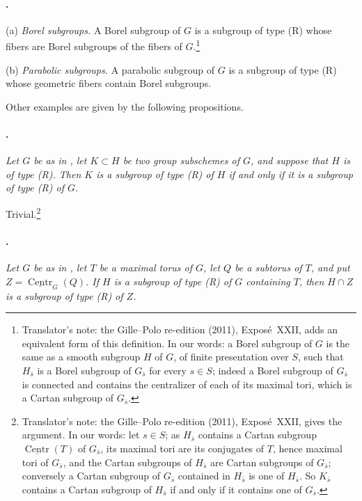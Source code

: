 \paragraph{.}
\textup{(a)} \emph{Borel subgroups.} A Borel subgroup of \(G\) is a
subgroup of type \textup{(R)} whose fibers are Borel subgroups of the
fibers of \(G\).\footnote{Translator's note: the Gille--Polo re-edition (2011), Exposé~XXII, adds an
equivalent form of this definition. In our words: a Borel subgroup of \(G\) is
the same as a smooth subgroup \(H\) of \(G\), of finite presentation over \(S\),
such that \(H_{\bar s}\) is a Borel subgroup of \(G_{\bar s}\) for every
\(s\in S\); indeed a Borel subgroup of \(G_{\bar s}\) is connected and
contains the centralizer of each of its maximal tori, which is a Cartan subgroup
of \(G_{\bar s}\).}

\textup{(b)} \emph{Parabolic subgroups.} A parabolic subgroup of
\(G\) is a subgroup of type \textup{(R)} whose geometric fibers
contain Borel subgroups.

Other examples are given by the following propositions.

\paragraph{.}
\textit{Let \(G\) be as in , let \(K\subset H\) be two group
subschemes of \(G\), and suppose that \(H\) is of type
\textup{(R)}. Then \(K\) is a subgroup of type \textup{(R)} of
\(H\) if and only if it is a subgroup of type \textup{(R)} of
\(G\).}

Trivial.\footnote{Translator's note: the Gille--Polo re-edition (2011), Exposé~XXII, gives
the argument. In our words: let \(s\in S\); as \(H_{\bar s}\) contains a Cartan
subgroup \(\underline{\operatorname{Centr}}(T)\) of \(G_{\bar s}\), its maximal
tori are its conjugates of \(T\), hence maximal tori of \(G_{\bar s}\), and the
Cartan subgroups of \(H_{\bar s}\) are Cartan subgroups of \(G_{\bar s}\);
conversely a Cartan subgroup of \(G_{\bar s}\) contained in \(H_{\bar s}\) is
one of \(H_{\bar s}\). So \(K_{\bar s}\) contains a Cartan subgroup of
\(H_{\bar s}\) if and only if it contains one of \(G_{\bar s}\).}

\paragraph{.}
\textit{Let \(G\) be as in , let \(T\) be a maximal torus of
\(G\), let \(Q\) be a subtorus of \(T\), and put
\(Z=\underline{\operatorname{Centr}}_G(Q)\). If \(H\) is a
subgroup of type \textup{(R)} of \(G\) containing \(T\), then
\(H\cap Z\) is a subgroup of type \textup{(R)} of \(Z\).}

